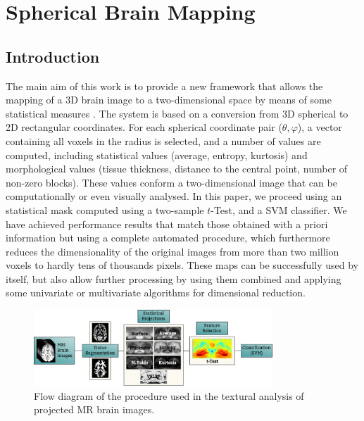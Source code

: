 \chapter{Spherical Brain Mapping}\label{ch:sbm}
\section{Introduction}

The main aim of this work is to provide a new framework that allows the mapping  of a 3D brain image to a two-dimensional space by means of some statistical measures \cite{Martinez-Murcia2015}. The system is based on a conversion from 3D spherical to 2D rectangular coordinates. For each spherical coordinate pair ($\theta,\varphi$), a vector containing all voxels  in the radius is selected, and a number of values are computed, including statistical values (average, entropy, kurtosis) and morphological values (tissue thickness, distance to the central point, number of non-zero blocks). These values conform a two-dimensional image that can be computationally or even visually analysed. In this paper, we proceed using an statistical mask computed using a two-sample $t$-Test, and a SVM classifier. We have achieved performance results that match those obtained with a priori information but using a complete automated procedure, which furthermore reduces the dimensionality of the original images from more than two million voxels to hardly tens of thousands pixels. These maps can be successfully used by itself, but also allow further processing by using them combined and applying some univariate or multivariate algorithms for dimensional reduction. 


\begin{figure}[htp]
	\centering
	\includegraphics[width=0.8\textwidth]{Graphics/ch6/01-flowdiagram}
	\caption{Flow diagram of the procedure used in the textural analysis of projected MR brain images.}
	\label{fig:flowdiagram}
\end{figure}

